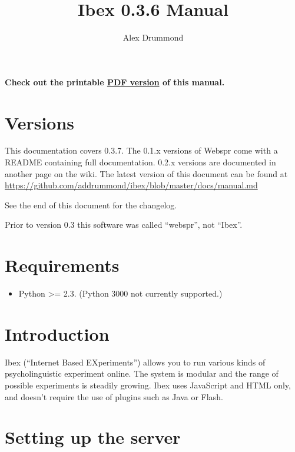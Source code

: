 \documentclass[]{article}
\date{}
\begin{document}
\date{}
\author{Alex Drummond}
\title{Ibex 0.3.6 Manual}

\maketitle

\tableofcontents

\textbf{Check out the printable \href{manual.pdf}{PDF version} of this
manual.}

\section{Versions}\label{versions}

This documentation covers 0.3.7. The 0.1.x versions of Webspr come with
a README containing full documentation. 0.2.x versions are documented in
another page on the wiki. The latest version of this document can be
found at
\url{https://github.com/addrummond/ibex/blob/master/docs/manual.md}

See the end of this document for the changelog.

Prior to version 0.3 this software was called ``webspr'', not ``Ibex''.

\section{Requirements}\label{requirements}

\begin{itemize}
\itemsep1pt\parskip0pt
\item
  Python \textgreater{}= 2.3. (Python 3000 not currently supported.)
\end{itemize}

\section{Introduction}\label{introduction}

Ibex (``Internet Based EXperiments'') allows you to run various kinds of
psycholinguistic experiment online. The system is modular and the range
of possible experiments is steadily growing. Ibex uses JavaScript and
HTML only, and doesn't require the use of plugins such as Java or Flash.

\section{Setting up the server}\label{setting-up-the-server}
\end{document}
